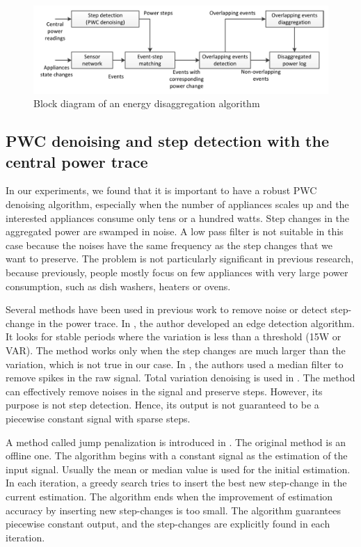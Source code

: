 \begin{figure}[htb]
  \centering
  \includegraphics[width=\textwidth]{figures/algooverview}
  \caption{Block diagram of an energy disaggregation algorithm}
  \label{fig:algooverview}
\end{figure}

\subsection{PWC denoising and step detection with the central power trace}

In our experiments, we found that it is important to have a robust PWC denoising algorithm, especially when the number of appliances scales up and the interested appliances consume only tens or a hundred watts. Step changes in the aggregated power are swamped in noise.  A low pass filter is not suitable in this case because the noises have the same frequency as the step changes that we want to preserve. 
 The problem is not particularly significant in previous research, because previously, people mostly focus on few appliances with very large power consumption, such as dish washers, heaters or ovens.
 
Several methods have been used in previous work to remove noise or detect step-change in the power trace. In \cite{Hart1992}, the author developed an edge detection algorithm. It looks for stable periods where the variation is less than a threshold (15W or VAR). The method works only when the step changes are much larger than the variation, which is not true in our case. In \cite{Norford1996}, the authors used a median filter to remove spikes in the raw signal. Total variation denoising is used in \cite{Kolter2012}. The method can effectively remove noises in the signal and preserve steps. However, its purpose is not step detection. Hence, its output is not guaranteed to be a piecewise constant signal with sparse steps. 

A method called jump penalization is introduced in \cite{Little2011}. The original method is an offline one. The algorithm begins with a constant signal as the estimation of the input signal. Usually the mean or median value is used for the initial estimation. In each iteration, a greedy search tries to insert the best new step-change in the current estimation. The algorithm ends when the improvement of estimation accuracy by inserting new step-changes is too small. The algorithm guarantees piecewise constant output, and the step-changes are explicitly found in each iteration. 

